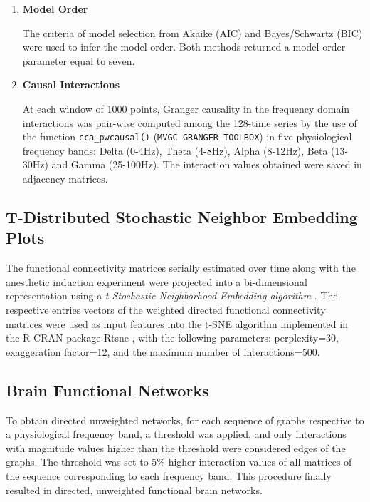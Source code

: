 \documentclass[twoside]{article}
\begin{document}
\begin{multicols}{2}
\begin{enumerate}

\item \textbf{Model Order}
  
 The criteria of model selection from Akaike (AIC) and Bayes/Schwartz (BIC) were used to infer the model order. Both methods returned a model order parameter equal to seven.

\item \textbf{Causal Interactions}

At each window of 1000 points, Granger causality in the frequency domain interactions was pair-wise computed among the 128-time series by the use of the function \texttt{cca\_pwcausal()} (\texttt{MVGC GRANGER TOOLBOX}) in five physiological frequency bands: Delta (0-4Hz), Theta (4-8Hz), Alpha (8-12Hz), Beta (13-30Hz) and Gamma (25-100Hz). The interaction values obtained were saved in adjacency matrices.


\end{enumerate}


\subsection*{T-Distributed Stochastic Neighbor Embedding Plots}

The functional connectivity matrices serially estimated over time along with the anesthetic induction experiment were projected into a bi-dimensional representation using a \textit{t-Stochastic Neighborhood Embedding algorithm} \citep{van2008visualizing}. The respective entries vectors of the weighted directed functional connectivity matrices were used as input features into the t-SNE algorithm \citep{van2008visualizing} implemented in the R-CRAN package Rtsne \citep{krijthe2018package}, with the following parameters: perplexity=30, exaggeration factor=12, and the maximum number of interactions=500. 



\subsection*{Brain Functional Networks}

To obtain directed unweighted networks, for each sequence of graphs respective to a physiological frequency band, a threshold was applied, and only interactions with magnitude values higher than the threshold were considered edges of the graphs. The threshold was set to 5\% higher interaction values of all matrices of the sequence corresponding to each frequency band. This procedure finally resulted in directed, unweighted functional brain networks.


\end{multicols}
\end{document}
